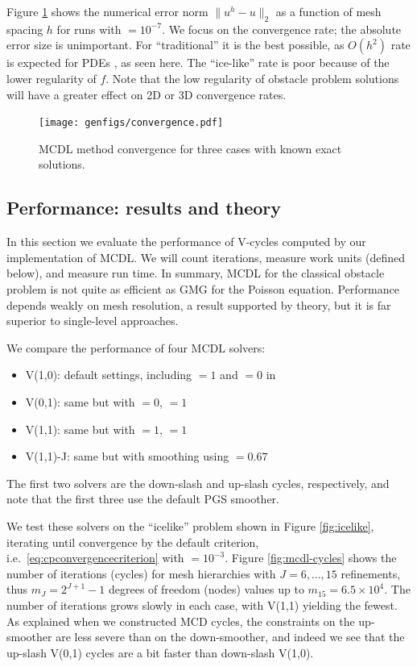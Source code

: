 \documentclass[letterpaper,final,12pt,reqno]{amsart}
\theoremstyle{claim}
\numberwithin{equation}{section}
\numberwithin{figure}{section}
\numberwithin{table}{section}
\numberwithin{theorem}{section}
\begin{document}
Figure \ref{fig:convergence} shows the numerical error norm $\|u^h-u\|_2$ as a function of mesh spacing $h$ for runs with  $=10^{-7}$.  We focus on the convergence rate; the absolute error size is unimportant.  For ``traditional'' it is the best possible, as $O(h^2)$ rate is expected for PDEs \cite{Elmanetal2014}, as seen here.  The ``ice-like'' rate is poor because of the lower regularity of $f$.  Note that the low regularity of obstacle problem solutions will have a greater effect on 2D or 3D convergence rates.

\begin{figure}
\texttt{[image: genfigs/convergence.pdf]}
\caption{MCDL method convergence for three cases with known exact solutions.}
\label{fig:convergence}
\end{figure}

\subsection{Performance: results and theory} \label{subsec:obstacleperformance}  In this section we evaluate the performance of V-cycles computed by our implementation of MCDL.  We will count iterations, measure work units (defined below), and measure run time.  In summary, MCDL for the classical obstacle problem is not quite as efficient as GMG for the Poisson equation.  Performance depends weakly on mesh resolution, a result supported by theory, but it is far superior to single-level approaches.

We compare the performance of four MCDL solvers:
\begin{itemize}
\item \textsf{V(1,0)}: default settings, including  $=1$ and  $=0$ in 
\item \textsf{V(0,1)}: same but with  $=0$,  $=1$
\item \textsf{V(1,1)}: same but with  $=1$,  $=1$
\item \textsf{V(1,1)-J}: same but with  smoothing using  $=0.67$
\end{itemize}
The first two solvers are the down-slash and up-slash cycles, respectively, and note that the first three use the default PGS smoother.

We test these solvers on the ``icelike'' problem shown in Figure \ref{fig:icelike}, iterating until convergence by the default criterion, i.e.~\eqref{eq:cpconvergencecriterion} with  $=10^{-3}$.  Figure \ref{fig:mcdl-cycles} shows the number of iterations (cycles) for mesh hierarchies with $J=6,\dots,15$ refinements, thus $m_J=2^{J+1}-1$ degrees of freedom (nodes) values up to $m_{15}=6.5 \times 10^4$.  The number of iterations grows slowly in each case, with V(1,1) yielding the fewest.  As explained when we constructed MCD cycles, the constraints on the up-smoother are less severe than on the down-smoother, and indeed we see that the up-slash V(0,1) cycles are a bit faster than down-slash V(1,0).
\end{document}
